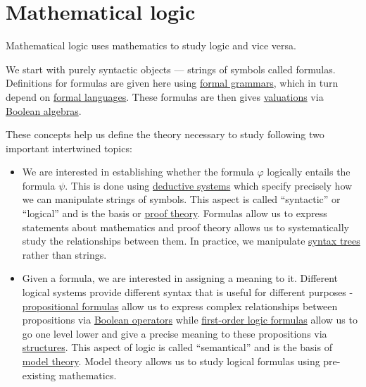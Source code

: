 \section{Mathematical logic}\label{sec:mathematical_logic}

Mathematical logic uses mathematics to study logic and vice versa.

We start with purely syntactic objects --- strings of symbols called formulas. Definitions for formulas are given here using \hyperref[def:formal_grammar]{formal grammars}, which in turn depend on \hyperref[def:formal_language]{formal languages}. These formulas are then gives \hyperref[def:first_order_valuation/formula_valuation]{valuations} via \hyperref[def:boolean_algebra]{Boolean algebras}.

These concepts help us define the theory necessary to study following two important intertwined topics:
\begin{itemize}
  \item We are interested in establishing whether the formula \( \varphi \) logically entails the formula \( \psi \). This is done using \hyperref[def:deductive_system]{deductive systems} which specify precisely how we can manipulate strings of symbols. This aspect is called \enquote{syntactic} or \enquote{logical} and is the basis or \hyperref[def:proof_derivability]{proof theory}. Formulas allow us to express statements about mathematics and proof theory allows us to systematically study the relationships between them. In practice, we manipulate \hyperref[rem:abstract_syntax_tree]{syntax trees} rather than strings.

  \item Given a formula, we are interested in assigning a meaning to it. Different logical systems provide different syntax that is useful for different purposes - \hyperref[def:propositional_syntax/formula]{propositional formulas} allow us to express complex relationships between propositions via \hyperref[subsec:boolean_operators]{Boolean operators} while \hyperref[def:first_order_syntax/formula]{first-order logic formulas} allow us to go one level lower and give a precise meaning to these propositions via \hyperref[def:first_order_structure]{structures}. This aspect of logic is called \enquote{semantical} and is the basis of \hyperref[subsec:first_order_models]{model theory}. Model theory allows us to study logical formulas using pre-existing mathematics.
\end{itemize}

